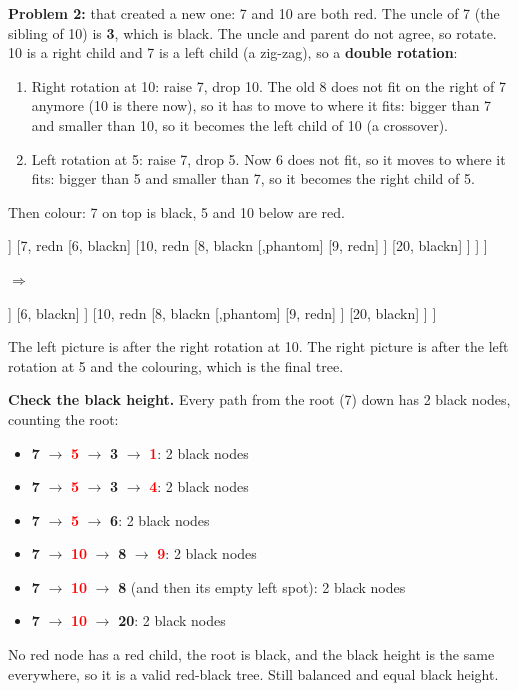 \documentclass[11pt]{article}
\newcommand{\rd}[1]{\textcolor{Red}{\textbf{#1}}}   %
\newcommand{\bk}[1]{\textbf{#1}}                    %
\begin{document}
	\textbf{Problem 2:} that created a new one: 7 and 10 are both red. The uncle of 7 (the sibling of 10) is \bk{3}, which is black. The uncle and parent do not agree, so rotate. 10 is a right child and 7 is a left child (a zig-zag), so a \textbf{double rotation}:
	\begin{enumerate}
		\item Right rotation at 10: raise 7, drop 10. The old 8 does not fit on the right of 7 anymore (10 is there now), so it has to move to where it fits: bigger than 7 and smaller than 10, so it becomes the left child of 10 (a crossover).
		\item Left rotation at 5: raise 7, drop 5. Now 6 does not fit, so it moves to where it fits: bigger than 5 and smaller than 7, so it becomes the right child of 5.
	\end{enumerate}
	Then colour: 7 on top is black, 5 and 10 below are red.
	\begin{center}
		\begin{forest}
			[5, blackn
			[3, blackn
			[1, redn]
			[4, redn]
			]
			[7, redn
			[6, blackn]
			[10, redn
			[8, blackn
			[,phantom]
			[9, redn]
			]
			[20, blackn]
			]
			]
			]
		\end{forest}
		\quad$\Rightarrow$\quad
		\begin{forest}
			[7, blackn
			[5, redn
			[3, blackn
			[1, redn]
			[4, redn]
			]
			[6, blackn]
			]
			[10, redn
			[8, blackn
			[,phantom]
			[9, redn]
			]
			[20, blackn]
			]
			]
		\end{forest}
	\end{center}
	The left picture is after the right rotation at 10. The right picture is after the left rotation at 5 and the colouring, which is the final tree.
	
	\textbf{Check the black height.} Every path from the root (7) down has 2 black nodes, counting the root:
	\begin{itemize}
		\item \bk{7} $\to$ \rd{5} $\to$ \bk{3} $\to$ \rd{1}: 2 black nodes
		\item \bk{7} $\to$ \rd{5} $\to$ \bk{3} $\to$ \rd{4}: 2 black nodes
		\item \bk{7} $\to$ \rd{5} $\to$ \bk{6}: 2 black nodes
		\item \bk{7} $\to$ \rd{10} $\to$ \bk{8} $\to$ \rd{9}: 2 black nodes
		\item \bk{7} $\to$ \rd{10} $\to$ \bk{8} (and then its empty left spot): 2 black nodes
		\item \bk{7} $\to$ \rd{10} $\to$ \bk{20}: 2 black nodes
	\end{itemize}
	No red node has a red child, the root is black, and the black height is the same everywhere, so it is a valid red-black tree. Still balanced and equal black height.
	
\end{document}
